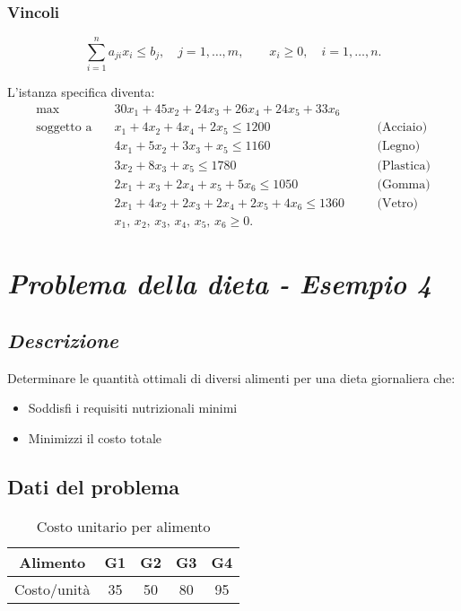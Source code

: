 \subsubsection{Vincoli}
\[ 
\sum_{i=1}^{n} a_{ji} x_i \leq b_j,\quad j = 1, \dots, m,\qquad x_i \geq 0, \quad i = 1, \dots, n.
\]

L'istanza specifica diventa:
\begin{align}
\max \quad & 30x_1 + 45x_2 + 24x_3 + 26x_4 + 24x_5 + 33x_6 \\[1mm]
\text{soggetto a} \quad
& x_1 + 4x_2 + 4x_4 + 2x_5 \leq 1200 \quad && \text{(Acciaio)} \\
& 4x_1 + 5x_2 + 3x_3 + x_5 \leq 1160 \quad && \text{(Legno)} \\
& 3x_2 + 8x_3 + x_5 \leq 1780 \quad && \text{(Plastica)} \\
& 2x_1 + x_3 + 2x_4 + x_5 + 5x_6 \leq 1050 \quad && \text{(Gomma)} \\
& 2x_1 + 4x_2 + 2x_3 + 2x_4 + 2x_5 + 4x_6 \leq 1360 \quad && \text{(Vetro)} \\
& x_1,\, x_2,\, x_3,\, x_4,\, x_5,\, x_6 \geq 0.
\end{align}

\section{\textbf{\textit{Problema della dieta - Esempio 4}}}

\subsection{\textbf{\textit{Descrizione}}}
Determinare le quantità ottimali di diversi alimenti per una dieta giornaliera che:
\begin{itemize}
    \item Soddisfi i requisiti nutrizionali minimi
    \item Minimizzi il costo totale
\end{itemize}

\subsection{Dati del problema}
\begin{table}[h]
\centering
\begin{tabular}{|c|c|c|c|c|}

\hline
Alimento & G1 & G2 & G3 & G4 \\ \hline
Costo/unità & 35 & 50 & 80 & 95 \\ \hline
\end{tabular}
\caption{Costo unitario per alimento}
\end{table}

